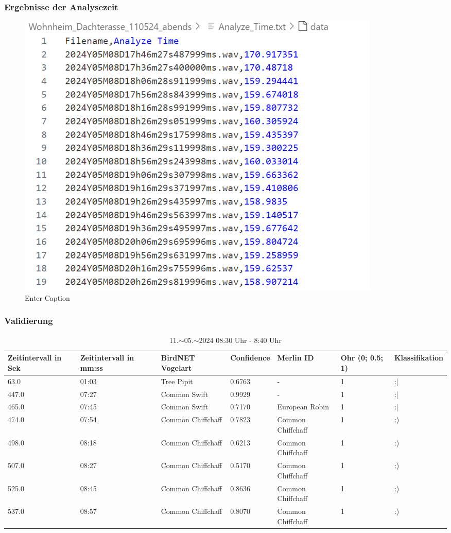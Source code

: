 \subsubsection{Ergebnisse der Analysezeit}
\begin{figure}
    \centering
    \includegraphics[width=1\linewidth]{bilder/analyze_time_wohnheim_02.png}
    \caption{Enter Caption}
    \label{fig:enter-label}
\end{figure}

\subsubsection{Validierung}


\begin{table}[]
\centering
\caption{11.$\sim$05.$\sim$2024 08:30 Uhr - 8:40 Uhr}
\label{tab:2024Y05M09D08h30m28s201983ms}
\begin{tabular}{|l|l|l|l|l|l|l|}
\hline
Zeitintervall in Sek & Zeitintervall in mm:ss & BirdNET Vogelart & Confidence & Merlin ID & Ohr (0; 0.5; 1) & Klassifikation \\ \hline
63.0  & 01:03 & Tree Pipit        & 0.6763 & -                 & 1 & :| \\ \hline
447.0 & 07:27 & Common Swift      & 0.9929 & -                 & 1 & :| \\ \hline
465.0 & 07:45 & Common Swift      & 0.7170 & European Robin    & 1 & :| \\ \hline
474.0 & 07:54 & Common Chiffchaff & 0.7823 & Common Chiffchaff & 1 & :) \\ \hline
498.0 & 08:18 & Common Chiffchaff & 0.6213 & Common Chiffchaff & 1 & :) \\ \hline
507.0 & 08:27 & Common Chiffchaff & 0.5170 & Common Chiffchaff & 1 & :) \\ \hline
525.0 & 08:45 & Common Chiffchaff & 0.8636 & Common Chiffchaff & 1 & :) \\ \hline
537.0 & 08:57 & Common Chiffchaff & 0.8070 & Common Chiffchaff & 1 & :) \\ \hline
\end{tabular}
\end{table}




